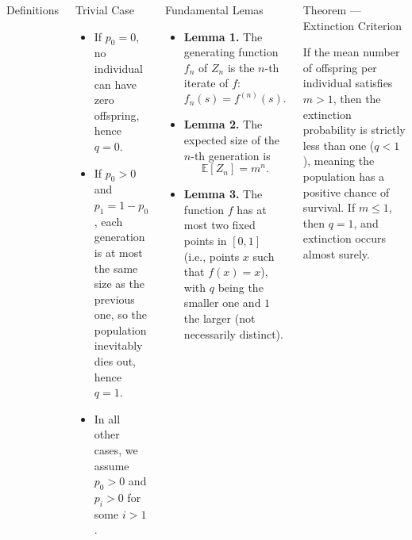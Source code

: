 \documentclass[palette=none,mode=dark]{impaTeXPoster}
\begin{document}
\begin{columns}
\begin{postercard}{Definitions}
\end{postercard}

\begin{postercard}{Trivial Case}
    
    \begin{itemize}
        \item If \(p_0 = 0\), no individual can have zero offspring, hence \(q = 0\).
        \item If \(p_0 > 0\) and \(p_1 = 1 - p_0\), each generation is at most the same size as the previous one, so the population inevitably dies out, hence \(q = 1\).
        \item In all other cases, we assume \(p_0 > 0\) and \(p_i > 0\) for some \(i > 1\).
    \end{itemize}

\end{postercard}


\begin{postercard}{Fundamental Lemas}

    \begin{itemize}
    
    \item \textbf{Lemma 1.}  
    The generating function $f_n$ of \(Z_n\) is the \(n\)-th iterate of \(f\):
    \[
    f_n(s) = f^{(n)}(s).
    \]
    
    \item \textbf{Lemma 2.}  
    The expected size of the \(n\)-th generation is
    \[
    \mathbb{E}[Z_n] = m^n.
    \]
    
    \item \textbf{Lemma 3.}  
    The function \(f\) has at most two fixed points in \([0,1]\) (i.e., points $x$ such that $f(x)=x$), with $q$ being the smaller one and $1$ the larger (not necessarily distinct).
    
    \end{itemize}

\end{postercard}


\begin{postercard}{Theorem — Extinction Criterion}

If the mean number of offspring per individual satisfies \(m > 1\), then the extinction probability is strictly less than one (\(q < 1\)), meaning the population has a positive chance of survival.  
If \(m \le 1\), then \(q = 1\), and extinction occurs almost surely.


\end{postercard}
\end{columns}
\end{document}
